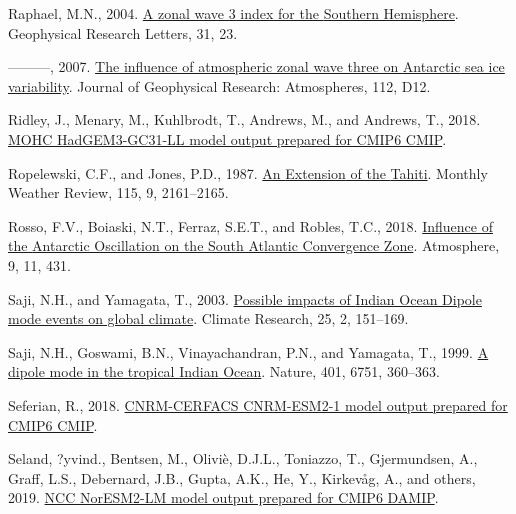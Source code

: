 \documentclass[12pt,oneside]{reedthesis}
\newlength{\cslhangindent}
\newenvironment{CSLReferences}[2] %
 {%
  \setlength{\parindent}{0pt}
  \ifodd #1 \everypar{\setlength{\hangindent}{\cslhangindent}}\ignorespaces\fi
  \ifnum #2 > 0
  \setlength{\parskip}{#2\baselineskip}
  \fi
 }%
 {}
\begin{document}
\begin{CSLReferences}{1}{0}
\leavevmode{}%
Raphael, M.N., 2004. \href{https://doi.org/10.1029/2004GL020365}{A zonal wave 3 index for the {Southern Hemisphere}}. Geophysical Research Letters, 31, 23.

\leavevmode{}%
---------, 2007. \href{https://doi.org/10.1029/2006JD007852}{The influence of atmospheric zonal wave three on {Antarctic} sea ice variability}. Journal of Geophysical Research: Atmospheres, 112, D12.

\leavevmode{}%
Ridley, J., Menary, M., Kuhlbrodt, T., Andrews, M., and Andrews, T., 2018. \href{https://doi.org/10.22033/ESGF/CMIP6.419}{MOHC HadGEM3-GC31-LL model output prepared for CMIP6 CMIP}.

\leavevmode{}%
Ropelewski, C.F., and Jones, P.D., 1987. \href{https://doi.org/10.1175/1520-0493(1987)115\%3C2161:AEOTTS\%3E2.0.CO;2}{An {Extension} of the {Tahiti}}. Monthly Weather Review, 115, 9, 2161--2165.

\leavevmode{}%
Rosso, F.V., Boiaski, N.T., Ferraz, S.E.T., and Robles, T.C., 2018. \href{https://doi.org/10.3390/atmos9110431}{Influence of the {Antarctic Oscillation} on the {South Atlantic Convergence Zone}}. Atmosphere, 9, 11, 431.

\leavevmode{}%
Saji, N.H., and Yamagata, T., 2003. \href{https://doi.org/10.3354/cr025151}{Possible impacts of {Indian Ocean Dipole} mode events on global climate}. Climate Research, 25, 2, 151--169.

\leavevmode{}%
Saji, N.H., Goswami, B.N., Vinayachandran, P.N., and Yamagata, T., 1999. \href{https://doi.org/10.1038/43854}{A dipole mode in the tropical {Indian Ocean}}. Nature, 401, 6751, 360--363.

\leavevmode{}%
Seferian, R., 2018. \href{https://doi.org/10.22033/ESGF/CMIP6.1391}{CNRM-CERFACS CNRM-ESM2-1 model output prepared for CMIP6 CMIP}.

\leavevmode{}%
Seland, ?yvind., Bentsen, M., Oliviè, D.J.L., Toniazzo, T., Gjermundsen, A., Graff, L.S., Debernard, J.B., Gupta, A.K., He, Y., Kirkevåg, A., and others, 2019. \href{https://doi.org/10.22033/ESGF/CMIP6.580}{NCC NorESM2-LM model output prepared for CMIP6 DAMIP}.


\end{CSLReferences}
\end{document}
